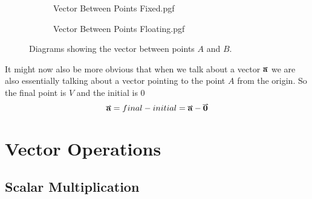 \documentclass[main.tex]{subfiles}
\begin{document}
                \begin{figure}[!h]
                    \centering
                    \begin{subfigure}[t]{0.45\textwidth}
                        \centering
                        \scalebox{0.8}
                        {
                        \begin{adjustbox}{clip,trim=35mm 10mm 20mm 10mm}
                            {{Vector Between Points Fixed.pgf}}
                        \end{adjustbox}
                        }
                    \end{subfigure}
                    \hfill
                    \begin{subfigure}[t]{0.45\textwidth}
                        \centering
                        \scalebox{0.8}
                        {
                        \begin{adjustbox}{clip,trim=35mm 10mm 15mm 10mm}
                            {{Vector Between Points Floating.pgf}}
                        \end{adjustbox}
                        }
                    \end{subfigure}
                    \vspace{-5mm}
                    \caption{Diagrams showing the vector between points $A$ and $B$.}
                    \label{fig: Vector Between Points}
                \end{figure}

                It might now also be more obvious that when we talk about a vector $\vect{a}$ we are also essentially talking about a vector pointing to the point $A$ from the origin. So the final point is $V$ and the initial is $0$
                \begin{equation}
                    \vect{a} = final - initial = \vect{a} - \vect{0}
                \end{equation}

                \newpage




        \section{Vector Operations}
            \label{sec: Vector Operations}

            \subsection{Scalar Multiplication}
                \label{subsec: Scalar Multiplication}
\end{document}
